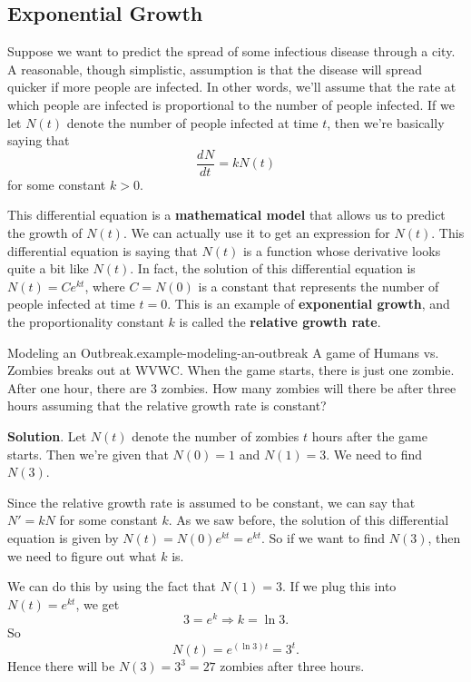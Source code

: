 \documentclass[10pt,]{book}
\newcommand{\terminology}[1]{\textbf{#1}}
\numberwithin{equation}{section}
\newcommand{\dv}[3][]{\dfrac{d^{#1} #2}{d #3^{#1}}}
\begin{document}
\subsection[{Exponential Growth}]{Exponential Growth}\label{subsection-exponential-growth}
\hypertarget{p-246}{}%
Suppose we want to predict the spread of some infectious disease through a city. A reasonable, though simplistic, assumption is that the disease will spread quicker if more people are infected. In other words, we'll assume that the rate at which people are infected is proportional to the number of people infected. If we let \(N(t)\) denote the number of people infected at time \(t\), then we're basically saying that%
\begin{equation*}
\dv{N}{t} = kN(t)
\end{equation*}
for some constant \(k > 0\).%
\par
\hypertarget{p-247}{}%
This differential equation is a \terminology{mathematical model} that allows us to predict the growth of \(N(t)\). We can actually use it to get an expression for \(N(t)\). This differential equation is saying that \(N(t)\) is a function whose derivative looks quite a bit like \(N(t)\). In fact, the solution of this differential equation is \(N(t) = Ce^{kt}\), where \(C = N(0)\) is a constant that represents the number of people infected at time \(t=0\). This is an example of \terminology{exponential growth}, and the proportionality constant \(k\) is called the \terminology{relative growth rate}.%
\begin{example}{Modeling an Outbreak.}{example-modeling-an-outbreak}%
\hypertarget{p-248}{}%
A game of Humans vs. Zombies breaks out at WVWC. When the game starts, there is just one zombie. After one hour, there are \(3\) zombies. How many zombies will there be after three hours assuming that the relative growth rate is constant?%
\par\smallskip%
\noindent\textbf{Solution}.\hypertarget{solution-54}{}\quad%
\hypertarget{p-249}{}%
Let \(N(t)\) denote the number of zombies \(t\) hours after the game starts. Then we're given that \(N(0) = 1\) and \(N(1) = 3\). We need to find \(N(3)\).%
\par
\hypertarget{p-250}{}%
Since the relative growth rate is assumed to be constant, we can say that \(N' = kN\) for some constant \(k\). As we saw before, the solution of this differential equation is given by \(N(t) = N(0)e^{kt} = e^{kt}\). So if we want to find \(N(3)\), then we need to figure out what \(k\) is.%
\par
\hypertarget{p-251}{}%
We can do this by using the fact that \(N(1) = 3\). If we plug this into \(N(t) = e^{kt}\), we get%
\begin{equation*}
3 = e^{k} \Rightarrow k = \ln3.
\end{equation*}
So%
\begin{equation*}
N(t) = e^{(\ln 3)t} = 3^{t}.
\end{equation*}
Hence there will be \(N(3) = 3^{3} = 27\) zombies after three hours.%
\end{example}
%
%
\typeout{************************************************}
\typeout{************************************************}
%
\end{document}
